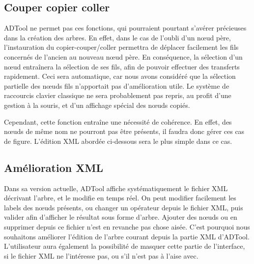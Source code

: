 	\subsection{Couper copier coller}
	
	ADTool ne permet pas ces fonctions, qui pourraient pourtant s'avérer précieuses dans la création des arbres. En effet, dans le cas de l'oubli d'un nœud père, l'instauration du copier-couper/coller permettra de déplacer facilement les fils concernés de l'ancien au nouveau nœud père.
	En conséquence, la sélection d'un nœud entraînera la sélection de ses fils, afin de pouvoir effectuer des transferts rapidement. Ceci sera automatique, car nous avons considéré que la sélection partielle des nœuds fils n'apportait pas d'amélioration utile. Le système de raccourcis clavier classique ne sera probablement pas repris, au profit d'une gestion à la souris, et d'un affichage spécial des nœuds copiés.

	Cependant, cette fonction entraîne une nécessité de cohérence. En effet, des nœuds de même nom ne pourront pas être présents, il faudra donc gérer ces cas de figure. L'édition XML abordée ci-dessous sera le plus simple dans ce cas.

	\subsection{Amélioration XML}

	Dans sa version actuelle, ADTool affiche systématiquement le fichier XML décrivant l'arbre, et le modifie en temps réel. On peut modifier facilement les labels des nœuds présents, ou changer un opérateur depuis le fichier XML, puis valider afin d'afficher le résultat sous forme d'arbre. Ajouter des nœuds ou en supprimer depuis ce fichier n'est en revanche pas chose aisée. C'est pourquoi nous souhaitons améliorer l'édition de l'arbre courant depuis la partie XML d'ADTool.
	L'utilisateur aura également la possibilité de masquer cette partie de l'interface, si le fichier XML ne l'intéresse pas, ou s'il n'est pas à l'aise avec.
	
